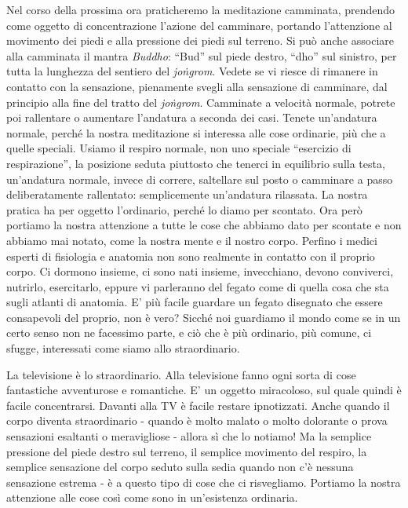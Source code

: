 
Nel corso della prossima ora praticheremo la meditazione camminata,
prendendo come oggetto di concentrazione l'azione del camminare,
portando l'attenzione al movimento dei piedi e alla pressione dei piedi
sul terreno. Si può anche associare alla camminata il mantra \textit{Buddho}:
``Bud'' sul piede destro, ``dho'' sul sinistro, per tutta la lunghezza del
sentiero del \textit{joṅgrom}. Vedete se vi riesce di rimanere in contatto con la
sensazione, pienamente svegli alla sensazione di camminare, dal
principio alla fine del tratto del \textit{joṅgrom}. Camminate a velocità
normale, potrete poi rallentare o aumentare l'andatura a seconda dei
casi. Tenete un'andatura normale, perché la nostra meditazione si
interessa alle cose ordinarie, più che a quelle speciali. Usiamo il
respiro normale, non uno speciale ``esercizio di respirazione'', la
posizione seduta piuttosto che tenerci in equilibrio sulla testa,
un'andatura normale, invece di correre, saltellare sul posto o camminare
a passo deliberatamente rallentato: semplicemente un'andatura rilassata.
La nostra pratica ha per oggetto l'ordinario, perché lo diamo per
scontato. Ora però portiamo la nostra attenzione a tutte le cose che
abbiamo dato per scontate e non abbiamo mai notato, come la nostra mente
e il nostro corpo. Perfino i medici esperti di fisiologia e anatomia non
sono realmente in contatto con il proprio corpo. Ci dormono insieme, ci
sono nati insieme, invecchiano, devono conviverci, nutrirlo,
esercitarlo, eppure vi parleranno del fegato come di quella cosa che sta
sugli atlanti di anatomia. E' più facile guardare un fegato disegnato
che essere consapevoli del proprio, non è vero? Sicché noi guardiamo il
mondo come se in un certo senso non ne facessimo parte, e ciò che è più
ordinario, più comune, ci sfugge, interessati come siamo allo
straordinario.

La televisione è lo straordinario. Alla televisione fanno ogni sorta di
cose fantastiche avventurose e romantiche. E' un oggetto miracoloso, sul
quale quindi è facile concentrarsi. Davanti alla TV è facile restare
ipnotizzati. Anche quando il corpo diventa straordinario - quando è
molto malato o molto dolorante o prova sensazioni esaltanti o
meravigliose - allora sì che lo notiamo! Ma la semplice pressione del
piede destro sul terreno, il semplice movimento del respiro, la semplice
sensazione del corpo seduto sulla sedia quando non c'è nessuna
sensazione estrema - è a questo tipo di cose che ci risvegliamo.
Portiamo la nostra attenzione alle cose così come sono in un'esistenza
ordinaria.

